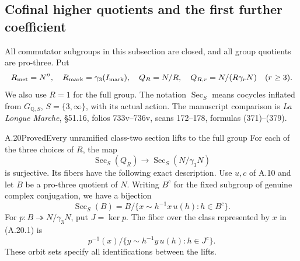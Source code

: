 \subsection{Cofinal higher quotients and the first further coefficient}

All commutator subgroups in this subsection are closed, and all group
quotients are pro-three. Put
\[
 R_{\rm met}=N'',\quad R_{\rm mark}=\gamma_3(I_{\rm mark}),\quad
 Q_R=N/R,\quad Q_{R,r}=N/(R\gamma_rN)\quad(r\ge3).
\]
We also use $R=1$ for the full group. The notation
$\operatorname{Sec}_S$ means cocycles inflated from
$G_{\mathbb Q,S}$, $S=\{3,\infty\}$, with its actual action.
The manuscript comparison is \emph{La Longue Marche}, \S51.16,
folios 733v--736v, scans 172--178, formulas (371)--(379).

\begin{statement}{A.20}{Proved}{Every unramified class-two section lifts to the full group}
For each of the three choices of $R$, the map
\[
 \operatorname{Sec}_S(Q_R)\longrightarrow
 \operatorname{Sec}_S(N/\gamma_3N)
\]
is surjective. Its fibers have the following exact description.
Use $u,c$ of A.10 and let $B$ be a pro-three quotient of $N$.
Writing $B^c$ for the fixed subgroup of genuine complex conjugation,
we have a bijection
\[
 \operatorname{Sec}_S(B)=
 B/\{x\sim h^{-1}x\,u(h):h\in B^c\}.                 \tag{A.20.1}
\]
For $p:B\twoheadrightarrow N/\gamma_3N$, put $J=\ker p$.
The fiber over the class represented by $x$ in (A.20.1) is
\[
 p^{-1}(x)/\{y\sim h^{-1}y\,u(h):h\in J^c\}.        \tag{A.20.2}
\]
These orbit sets specify all identifications between the lifts.
\end{statement}
